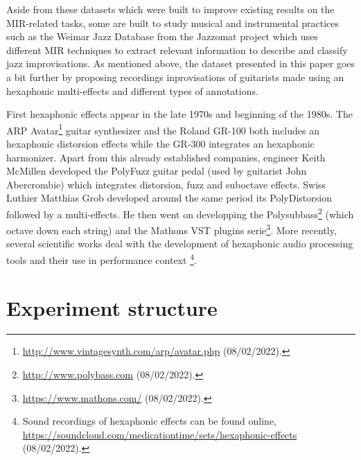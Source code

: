 \documentclass{article}
\begin{document}
Aside from these datasets which were built to improve existing results on the MIR-related tasks, some are built to study musical and instrumental practices such as the Weimar Jazz Database \cite{Pfleiderer:2017:BOOK} from the Jazzomat project \cite{Frieler:2013:Jazzomat} which uses different MIR techniques to extract relevant information to describe and classify jazz improvisations. As mentioned above, the dataset presented in this paper goes a bit further by proposing recordings inprovisations of guitarists made using an hexaphonic multi-effects and different types of annotations.

First hexaphonic effects appear in the late 1970s and beginning of the 1980s. The ARP Avatar\footnote{\url{http://www.vintagesynth.com/arp/avatar.php} (08/02/2022).} guitar synthesizer and the Roland GR-100\cite{joness-gr100} both includes an hexaphonic distorsion effects while the GR-300\cite{joness-gr300} integrates an hexaphonic harmonizer. Apart from this already established companies, engineer Keith McMillen developed the PolyFuzz\cite{McMillen2015-timeline} guitar pedal (used by guitarist John Abercrombie) which integrates distorsion, fuzz and suboctave effects. Swiss Luthier Matthias Grob developed around the same period its PolyDistorsion \cite{grob:paradisGuitar} followed by a multi-effects. He then went on developping the Polysubbass\footnote{\url{http://www.polybass.com} (08/02/2022).} (which octave down each string) and the Mathons VST plugins serie\footnote{\url{https://www.mathons.com/} (08/02/2022).}.
More recently, several scientific works deal with the development of hexaphonic audio processing tools \cite{sci:Puckette2007, sci:Reboursiere2010} and their use in performance context \cite{Reboursiere2020_Puzzle_fr,sci:Graham2012, Bates2009}\footnote{Sound recordings of hexaphonic effects can be found online, \url{https://soundcloud.com/medicationtime/sets/hexaphonic-effects} (08/02/2022).}.


\section{Experiment structure}\label{sec:exp_structure}
\end{document}
